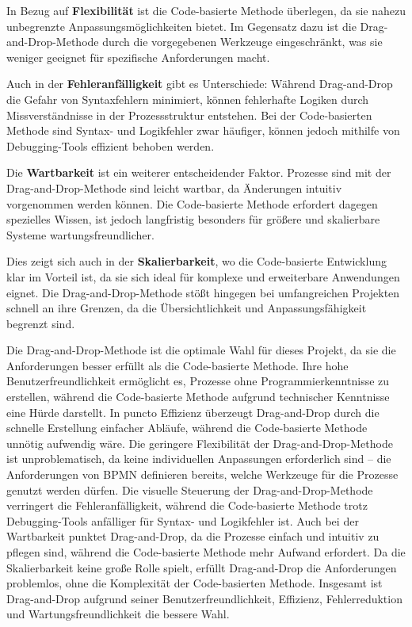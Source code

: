 In Bezug auf \textbf{Flexibilität} ist die Code-basierte Methode überlegen, da sie nahezu unbegrenzte Anpassungsmöglichkeiten bietet. Im Gegensatz dazu ist die Drag-and-Drop-Methode durch die vorgegebenen Werkzeuge eingeschränkt, was sie weniger geeignet für spezifische Anforderungen macht.

Auch in der \textbf{Fehleranfälligkeit} gibt es Unterschiede: Während Drag-and-Drop die Gefahr von Syntaxfehlern minimiert, können fehlerhafte Logiken durch Missverständnisse in der Prozessstruktur entstehen. Bei der Code-basierten Methode sind Syntax- und Logikfehler zwar häufiger, können jedoch mithilfe von Debugging-Tools effizient behoben werden.

Die \textbf{Wartbarkeit} ist ein weiterer entscheidender Faktor. Prozesse sind mit der Drag-and-Drop-Methode sind leicht wartbar, da Änderungen intuitiv vorgenommen werden können. Die Code-basierte Methode erfordert dagegen spezielles Wissen, ist jedoch langfristig besonders für größere und skalierbare Systeme wartungsfreundlicher.

Dies zeigt sich auch in der \textbf{Skalierbarkeit}, wo die Code-basierte Entwicklung klar im Vorteil ist, da sie sich ideal für komplexe und erweiterbare Anwendungen eignet. Die Drag-and-Drop-Methode stößt hingegen bei umfangreichen Projekten schnell an ihre Grenzen, da die Übersichtlichkeit und Anpassungsfähigkeit begrenzt sind.

Die Drag-and-Drop-Methode ist die optimale Wahl für dieses Projekt, da sie die Anforderungen besser erfüllt als die Code-basierte Methode. Ihre hohe Benutzerfreundlichkeit ermöglicht es, Prozesse ohne Programmierkenntnisse zu erstellen, während die Code-basierte Methode aufgrund technischer Kenntnisse eine Hürde darstellt.
In puncto Effizienz überzeugt Drag-and-Drop durch die schnelle Erstellung einfacher Abläufe, während die Code-basierte Methode unnötig aufwendig wäre. Die geringere Flexibilität der Drag-and-Drop-Methode ist unproblematisch, da keine individuellen Anpassungen erforderlich sind – die Anforderungen von BPMN definieren bereits, welche Werkzeuge für die Prozesse genutzt werden dürfen.
Die visuelle Steuerung der Drag-and-Drop-Methode verringert die Fehleranfälligkeit, während die Code-basierte Methode trotz Debugging-Tools anfälliger für Syntax- und Logikfehler ist. Auch bei der Wartbarkeit punktet Drag-and-Drop, da die Prozesse einfach und intuitiv zu pflegen sind, während die Code-basierte Methode mehr Aufwand erfordert.
Da die Skalierbarkeit keine große Rolle spielt, erfüllt Drag-and-Drop die Anforderungen problemlos, ohne die Komplexität der Code-basierten Methode. Insgesamt ist Drag-and-Drop aufgrund seiner Benutzerfreundlichkeit, Effizienz, Fehlerreduktion und Wartungsfreundlichkeit die bessere Wahl.

